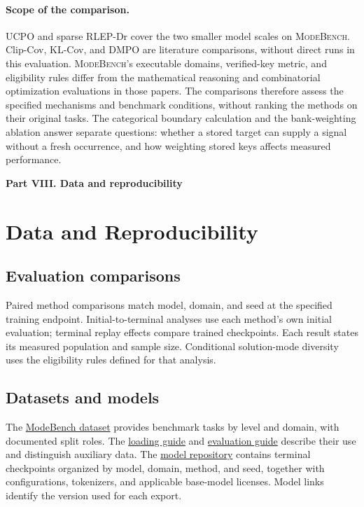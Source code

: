 \documentclass{article}
\newcommand{\1}{\mathbf 1}
\newcommand{\mb}{\textsc{ModeBench}}
\theoremstyle{remark}
\theoremstyle{definition}
\theoremstyle{plain}
\begin{document}
\paragraph{Scope of the comparison.}
UCPO and sparse RLEP-Dr cover the two smaller model scales on \mb{}.
Clip-Cov, KL-Cov, and DMPO are literature comparisons, without direct runs
in this evaluation. \mb{}'s executable domains, verified-key metric, and
eligibility rules differ from the mathematical reasoning and combinatorial
optimization evaluations in those papers. The comparisons therefore assess
the specified mechanisms and benchmark conditions, without ranking the
methods on their original tasks. The categorical boundary calculation and
the bank-weighting ablation answer separate questions: whether a stored
target can supply a signal without a fresh occurrence, and how weighting
stored keys affects measured performance.

\clearpage
{}
\begin{center}\large\textbf{Part VIII. Data and reproducibility}\end{center}

\section{Data and Reproducibility}
\label{app:reproducibility}

\subsection{Evaluation comparisons}
\label{app:source-integrity}
\label{app:initial-provenance}
\label{app:scheduled-provenance}

Paired method comparisons match model, domain, and seed at the specified
training endpoint. Initial-to-terminal analyses use each method's own
initial evaluation; terminal replay effects compare trained checkpoints.
Each result states its measured population and sample size. Conditional
solution-mode diversity uses the eligibility rules defined for that
analysis.

\subsection{Datasets and models}
\label{app:repro-artifacts}
\label{app:repro-code}
\label{app:archived-models}

The \href{https://huggingface.co/datasets/od2961/ModeBench}{ModeBench dataset}
provides benchmark tasks by level and domain, with documented split
roles. The
\href{https://huggingface.co/datasets/od2961/ModeBench\#loading}{loading guide}
and \href{https://huggingface.co/datasets/od2961/ModeBench\#evaluation}{evaluation guide}
describe their use and distinguish auxiliary data.
The \href{https://huggingface.co/od2961/maxent-grpo-models}{model repository}
contains terminal checkpoints organized by model, domain, method, and
seed, together with configurations, tokenizers, and applicable base-model
licenses. Model links identify the version used for each export.
\end{document}
